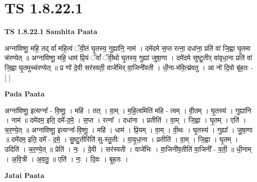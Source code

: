 \documentclass[17pt]{extarticle}
\begin{document}
\section{ TS 1.8.22.1 }

\textbf{TS 1.8.22.1 } \newline
\textbf{Samhita Paata} \newline

अग्ना॑विष्णू॒ महि॒ तद् वां᳚ महि॒त्वं ॅवी॒तं घृ॒तस्य॒ गुह्या॑नि॒ नाम॑ । दमे॑दमे स॒प्त रत्ना॒ दधा॑ना॒ प्रति॑ वां जि॒ह्वा घृ॒तमा च॑रण्येत् ॥ अग्ना॑विष्णू॒ महि॒ धाम॑ प्रि॒यं ॅवां᳚ ॅवी॒थो घृ॒तस्य॒ गुह्या॑ जुषा॒णा । दमे॑दमे सुष्टु॒तीर् वा॑वृधा॒ना प्रति॑ वां जि॒ह्वा घृ॒तमुच्च॑रण्येत् ॥ प्र णो॑ दे॒वी सर॑स्वती॒ वाजे॑भिर् वा॒जिनी॑वती । धी॒ना-म॑वि॒त्य्र॑वतु । आ नो॑ दि॒वो बृ॑ह॒तः - [ ] \newline

\textbf{Pada Paata} \newline

अग्ना॑विष्णू॒ इत्यग्ना᳚ - वि॒ष्णू॒ । महि॑ । तत् । वा॒म् । म॒हि॒त्वमिति॑ महि - त्वम् । वी॒तम् । घृ॒तस्य॑ । गुह्या॑नि । नाम॑ ॥ दमे॑दम॒ इति॒ दमे᳚-द॒मे॒ । स॒प्त । रत्ना᳚ । दधा॑ना । प्रतीति॑ । वा॒म् । जि॒ह्वा । घृ॒तम् । एति॑ । च॒र॒ण्ये॒त् ॥ अग्ना॑विष्णू॒ इत्यग्ना᳚-वि॒ष्णू॒ । महि॑ । धाम॑ । प्रि॒यम् । वा॒म् । वी॒थः । घृ॒तस्य॑ । गुह्या᳚ । जु॒षा॒णा ॥ दमे॑दम॒ इति॒ दमे᳚ - द॒मे॒ । सु॒ष्टु॒तीरिति॑ सु-स्तु॒तीः । वा॒वृ॒धा॒ना । प्रतीति॑ । वा॒म् । जि॒ह्वा । घृ॒तम् । उदिति॑ । च॒र॒ण्ये॒त् ॥ प्रेति॑ । नः॒ । दे॒वी । सर॑स्वती । वाजे॑भिः । वा॒जिनी॑व॒तीति॑ वा॒जिनी᳚ - व॒ती॒ ॥ धी॒नाम् । अ॒वि॒त्री । अ॒व॒तु॒ ॥ एति॑ । नः॒ । दि॒वः । बृ॒ह॒तः ।  \newline



\textbf{Jatai Paata} \newline
\end{document}

